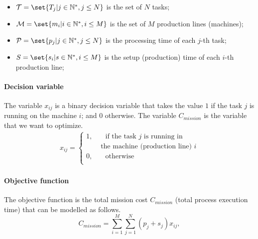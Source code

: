 \documentclass[conference,harvard,brazil,english]{sbatex}
\begin{document}
\begin{itemize}
\item $\mathcal{T} = \set{T_j \vert j\in \mathbb{N}^{*},j\leq N}$ is the set of $N$ tasks;
\item $\mathcal{M} = \set{m_i \vert i\in \mathbb{N}^{*},i\leq M}$ is the set of $M$ production lines (machines);
\item $\mathcal{P} = \set{p_j \vert j\in \mathbb{N}^{*},j\leq N}$ is the processing time of each $j$-th task;
\item $S = \set{s_i \vert s\in \mathbb{N}^{*},i\leq M}$  is the setup (production) time of each $i$-th production line;
\end{itemize}

\paragraph{Decision variable}

The variable $x_{ij}$ is a binary decision variable that takes the value $1$ if the task $j$ is running on the machine $i$; and $0$ otherwise. The variable $C_ {mission}$ is the variable that we want to optimize.
%
\begin{equation}
\label{eq:decision}
\begin{split}
x_{ij}=\begin{cases}
    1,       & \quad \text{if the task } j \text{ is running in} \\
 &\text{ the machine (production line) }i\\
    0,  & \quad \text{otherwise}\\
  \end{cases}
\end{split}
\end{equation}

\paragraph{Objective function}

The objective function is the total mission cost $C_{mission}$ (total process execution time) that can be modelled as follows.
%
\begin{equation}
\label{eq:objfunction}
C_{mission}=\sum_{i=1}^{M}{\sum_{j=1}^{N}{
 (p_j+s_j)x_{ij}}},
\end{equation}
\end{document}
